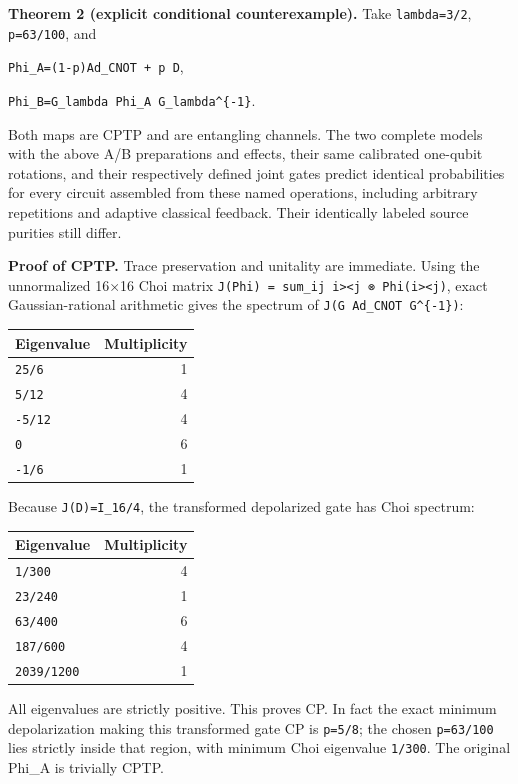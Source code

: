 \documentclass[
  10pt,
  a4paper,
]{article}
\begin{document}
\textbf{Theorem 2 (explicit conditional counterexample).} Take \texttt{lambda=3/2}, \texttt{p=63/100}, and

\texttt{Phi\_A=(1-p)Ad\_CNOT\ +\ p\ D},

\texttt{Phi\_B=G\_lambda\ Phi\_A\ G\_lambda\^{}\{-1\}}.

Both maps are CPTP and are entangling channels. The two complete models with the above A/B preparations and effects, their same calibrated one-qubit rotations, and their respectively defined joint gates predict identical probabilities for every circuit assembled from these named operations, including arbitrary repetitions and adaptive classical feedback. Their identically labeled source purities still differ.

\textbf{Proof of CPTP.} Trace preservation and unitality are immediate. Using the unnormalized 16×16 Choi matrix \texttt{J(Phi)\ =\ sum\_ij\ \textbar{}i\textgreater{}\textless{}j\textbar{}\ ⊗\ Phi(\textbar{}i\textgreater{}\textless{}j\textbar{})}, exact Gaussian-rational arithmetic gives the spectrum of \texttt{J(G\ Ad\_CNOT\ G\^{}\{-1\})}:

\begin{longtable}[]{@{}lr@{}}
\toprule\noalign{}
Eigenvalue & Multiplicity \\
\midrule\noalign{}
\endhead
\bottomrule\noalign{}
\endlastfoot
\texttt{25/6} & 1 \\
\texttt{5/12} & 4 \\
\texttt{-5/12} & 4 \\
\texttt{0} & 6 \\
\texttt{-1/6} & 1 \\
\end{longtable}

Because \texttt{J(D)=I\_16/4}, the transformed depolarized gate has Choi spectrum:

\begin{longtable}[]{@{}lr@{}}
\toprule\noalign{}
Eigenvalue & Multiplicity \\
\midrule\noalign{}
\endhead
\bottomrule\noalign{}
\endlastfoot
\texttt{1/300} & 4 \\
\texttt{23/240} & 1 \\
\texttt{63/400} & 6 \\
\texttt{187/600} & 4 \\
\texttt{2039/1200} & 1 \\
\end{longtable}

All eigenvalues are strictly positive. This proves CP. In fact the exact minimum depolarization making this transformed gate CP is \texttt{p=5/8}; the chosen \texttt{p=63/100} lies strictly inside that region, with minimum Choi eigenvalue \texttt{1/300}. The original Phi\_A is trivially CPTP.
\end{document}
